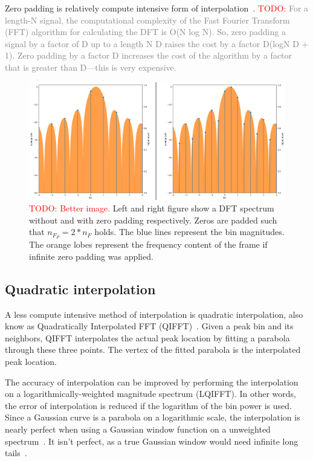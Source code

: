 \documentclass[10pt,twocolumn]{article}
\begin{document}
Zero padding is relatively compute intensive form of interpolation~\cite{interpolnozero}. %
\textcolor{red}{TODO: }\textcolor{gray}{For a length-N signal, the computational complexity of the Fast Fourier Transform (FFT) algorithm for calculating the DFT is O(N log N). So, zero padding a signal by a factor of D up to a length N D raises the cost by a factor D(logN D + 1). Zero padding by a factor D increases the cost of the algorithm by a factor that is greater than D—this is very expensive.}
\begin{figure}[h]
    \centering
    \includegraphics[width=\linewidth]{fig/zero_pad_interpolate.png}
    \caption{\textcolor{red}{TODO: Better image.} Left and right figure show a DFT spectrum without and with zero padding respectively. Zeros are padded such that $n_{F_P} = 2 * n_F$ holds. The blue lines represent the bin magnitudes. The orange lobes represent the frequency content of the frame if infinite zero padding was applied.}
    \label{fig:visualpadding}
\end{figure}

\subsection{Quadratic interpolation}
A less compute intensive method of interpolation is quadratic interpolation, also know as Quadratically Interpolated FFT (QIFFT)~\cite{interpolnozero}. Given a peak bin and its neighbors, QIFFT interpolates the actual peak location by fitting a parabola through these three points. The vertex of the fitted parabola is the interpolated peak location.

The accuracy of interpolation can be improved by performing the interpolation on a logarithmically-weighted magnitude spectrum (LQIFFT). In other words, the error of interpolation is reduced if the logarithm of the bin power is used. Since a Gaussian curve is a parabola on a logarithmic scale, the interpolation is nearly perfect when using a Gaussian window function on a unweighted spectrum~\cite{interpolgaus}. It isn't perfect, as a true Gaussian window would need infinite long tails~\cite{gauswin}.
\end{document}
